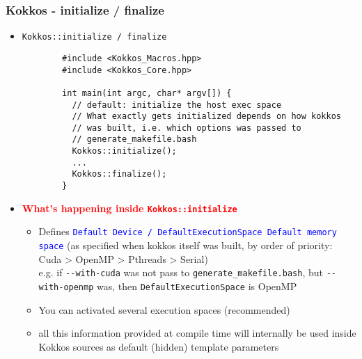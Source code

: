 \begin{frame}[fragile=singleslide]
  \frametitle{Kokkos - initialize / finalize}

  \begin{itemize}
  \item \texttt{Kokkos::initialize / finalize}
    {\small\begin{verbatim}
        #include <Kokkos_Macros.hpp>
        #include <Kokkos_Core.hpp>
        
        int main(int argc, char* argv[]) {
          // default: initialize the host exec space
          // What exactly gets initialized depends on how kokkos
          // was built, i.e. which options was passed to
          // generate_makefile.bash
          Kokkos::initialize();
          ...
          Kokkos::finalize();
        }
      \end{verbatim}
    }
  \item \textcolor{red}{\textbf{What's happening inside \texttt{Kokkos::initialize}}}
    \begin{itemize}
    \item Defines \textcolor{blue}{\texttt{Default Device / DefaultExecutionSpace Default memory space}} (as specified when kokkos itself was built, by order of priority: Cuda > OpenMP > Pthreads > Serial)\\
      e.g. if \texttt{\--\--with-cuda} was not pass to \texttt{generate\_makefile.bash}, but \texttt{\--\--with-openmp} was, then \texttt{DefaultExecutionSpace} is OpenMP
    \item You can activated several execution spaces (recommended)
    \item all this information provided at compile time will internally be used inside Kokkos sources as default (hidden) template parameters
    \end{itemize}
  \end{itemize}
\end{frame}


